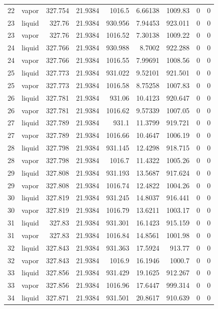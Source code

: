 \begin{longtable}{r l r r r r r r r}
22 & vapor & 327.754 & 21.9384 & 1016.5 & 6.66138 & 1009.83 & 0 & 0 \\
23 & liquid & 327.76 & 21.9384 & 930.956 & 7.94453 & 923.011 & 0 & 0 \\
23 & vapor & 327.76 & 21.9384 & 1016.52 & 7.30138 & 1009.22 & 0 & 0 \\
24 & liquid & 327.766 & 21.9384 & 930.988 & 8.7002 & 922.288 & 0 & 0 \\
24 & vapor & 327.766 & 21.9384 & 1016.55 & 7.99691 & 1008.56 & 0 & 0 \\
25 & liquid & 327.773 & 21.9384 & 931.022 & 9.52101 & 921.501 & 0 & 0 \\
25 & vapor & 327.773 & 21.9384 & 1016.58 & 8.75258 & 1007.83 & 0 & 0 \\
26 & liquid & 327.781 & 21.9384 & 931.06 & 10.4123 & 920.647 & 0 & 0 \\
26 & vapor & 327.781 & 21.9384 & 1016.62 & 9.57339 & 1007.05 & 0 & 0 \\
27 & liquid & 327.789 & 21.9384 & 931.1 & 11.3799 & 919.721 & 0 & 0 \\
27 & vapor & 327.789 & 21.9384 & 1016.66 & 10.4647 & 1006.19 & 0 & 0 \\
28 & liquid & 327.798 & 21.9384 & 931.145 & 12.4298 & 918.715 & 0 & 0 \\
28 & vapor & 327.798 & 21.9384 & 1016.7 & 11.4322 & 1005.26 & 0 & 0 \\
29 & liquid & 327.808 & 21.9384 & 931.193 & 13.5687 & 917.624 & 0 & 0 \\
29 & vapor & 327.808 & 21.9384 & 1016.74 & 12.4822 & 1004.26 & 0 & 0 \\
30 & liquid & 327.819 & 21.9384 & 931.245 & 14.8037 & 916.441 & 0 & 0 \\
30 & vapor & 327.819 & 21.9384 & 1016.79 & 13.6211 & 1003.17 & 0 & 0 \\
31 & liquid & 327.83 & 21.9384 & 931.301 & 16.1423 & 915.159 & 0 & 0 \\
31 & vapor & 327.83 & 21.9384 & 1016.84 & 14.8561 & 1001.98 & 0 & 0 \\
32 & liquid & 327.843 & 21.9384 & 931.363 & 17.5924 & 913.77 & 0 & 0 \\
32 & vapor & 327.843 & 21.9384 & 1016.9 & 16.1946 & 1000.7 & 0 & 0 \\
33 & liquid & 327.856 & 21.9384 & 931.429 & 19.1625 & 912.267 & 0 & 0 \\
33 & vapor & 327.856 & 21.9384 & 1016.96 & 17.6447 & 999.314 & 0 & 0 \\
34 & liquid & 327.871 & 21.9384 & 931.501 & 20.8617 & 910.639 & 0 & 0 \\

\end{longtable}
